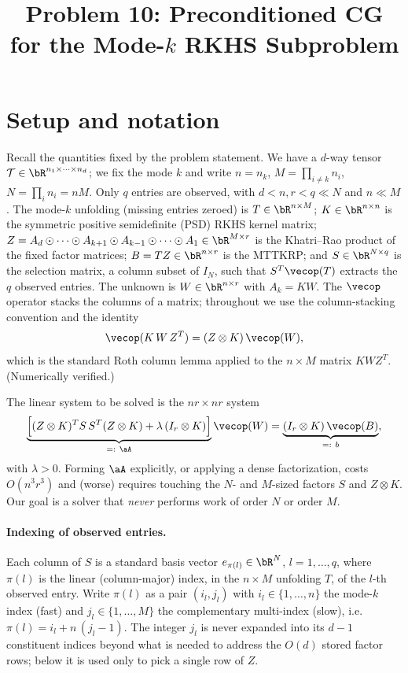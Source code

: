 \documentclass[12pt]{article}
\theoremstyle{definition}
\begin{document}
\title{Problem 10: Preconditioned CG for the Mode-$k$ RKHS Subproblem}
\date{}
\maketitle

\section{Setup and notation}

Recall the quantities fixed by the problem statement. We have a $d$-way tensor
$\mathcal T\in\bR^{n_1\times\cdots\times n_d}$; we fix the mode $k$ and write
$n=n_k$, $M=\prod_{i\neq k}n_i$, $N=\prod_i n_i=nM$. Only $q$ entries are
observed, with $d<n,r<q\ll N$ and $n\ll M$. The mode-$k$ unfolding (missing
entries zeroed) is $T\in\bR^{n\times M}$; $K\in\bR^{n\times n}$ is the symmetric
positive semidefinite (PSD) RKHS kernel matrix; $Z=A_d\odot\cdots\odot
A_{k+1}\odot A_{k-1}\odot\cdots\odot A_1\in\bR^{M\times r}$ is the Khatri--Rao
product of the fixed factor matrices; $B=TZ\in\bR^{n\times r}$ is the MTTKRP; and
$S\in\bR^{N\times q}$ is the selection matrix, a column subset of $I_N$, such
that $S^{T}\vecop(T)$ extracts the $q$ observed entries. The unknown is
$W\in\bR^{n\times r}$ with $A_k=KW$. The $\vecop$ operator stacks the columns of
a matrix; throughout we use the column-stacking convention and the identity
\begin{equation}\label{eq:kronvec}
\vecop(K\,W\,Z^{T})=(Z\otimes K)\,\vecop(W),
\end{equation}
which is the standard Roth column lemma applied to the $n\times M$ matrix
$KWZ^{T}$. (Numerically verified.)

The linear system to be solved is the $nr\times nr$ system
\begin{equation}\label{eq:system}
\underbrace{\Big[(Z\otimes K)^{T}S\,S^{T}(Z\otimes K)+\lambda\,(I_r\otimes K)\Big]}_{=:~\aA}
\vecop(W)=\underbrace{(I_r\otimes K)\,\vecop(B)}_{=:~b},
\end{equation}
with $\lambda>0$. Forming $\aA$ explicitly, or applying a dense factorization,
costs $O(n^3r^3)$ and (worse) requires touching the $N$- and $M$-sized factors
$S$ and $Z\otimes K$. Our goal is a solver that
\emph{never} performs work of order $N$ or order $M$.

\paragraph{Indexing of observed entries.}
Each column of $S$ is a standard basis vector $e_{\pi(l)}\in\bR^{N}$,
$l=1,\dots,q$, where $\pi(l)$ is the linear (column-major) index, in the
$n\times M$ unfolding $T$, of the $l$-th observed entry. Write $\pi(l)$ as a
pair $(i_l,j_l)$ with $i_l\in\{1,\dots,n\}$ the mode-$k$ index (fast) and
$j_l\in\{1,\dots,M\}$ the complementary multi-index (slow), i.e.
$\pi(l)=i_l+n\,(j_l-1)$. The integer $j_l$ is never expanded into its $d-1$
constituent indices beyond what is needed to address the $O(d)$ stored factor
rows; below it is used only to pick a single row of $Z$.
\end{document}
